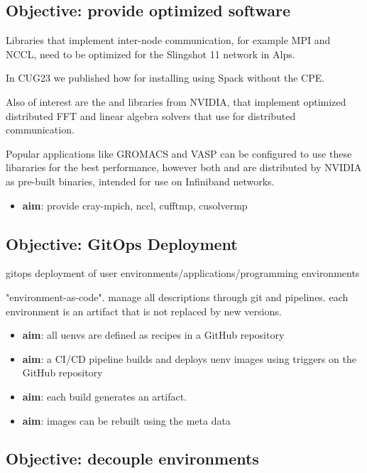\subsection{Objective: provide optimized software}

Libraries that implement inter-node communication, for example MPI and NCCL, need to be optimized for the Slingshot 11 network in Alps.

In CUG23 we published how for installing \craympich using Spack without the CPE.

Also of interest are the \cufftmp and \cusolvermp libraries from NVIDIA, that implement optimized distributed FFT and linear algebra solvers that use \nvshmem for distributed communication.

Popular applications like GROMACS and VASP can be configured to use these libararies for the best performance, however both \cufftmp and \cusolvermp are distributed by NVIDIA as pre-built binaries, intended for use on Infiniband networks.

\begin{itemize}
    \item \textbf{aim}: provide cray-mpich, nccl, cufftmp, cusolvermp
\end{itemize}
\subsection{Objective: GitOps Deployment}

gitops deployment of user environments/applications/programming environments

"environment-as-code".
manage all descriptions through git and pipelines.
each environment is an artifact that is not replaced by new versions.

\begin{itemize}
    \item \textbf{aim}: all uenvs are defined as recipes in a GitHub repository
    \item \textbf{aim}: a CI/CD pipeline builds and deploys uenv images using triggers on the GitHub repository
    \item \textbf{aim}: each build generates an artifact.
    \item \textbf{aim}: images can be rebuilt using the meta data
\end{itemize}

\subsection{Objective: decouple environments}

